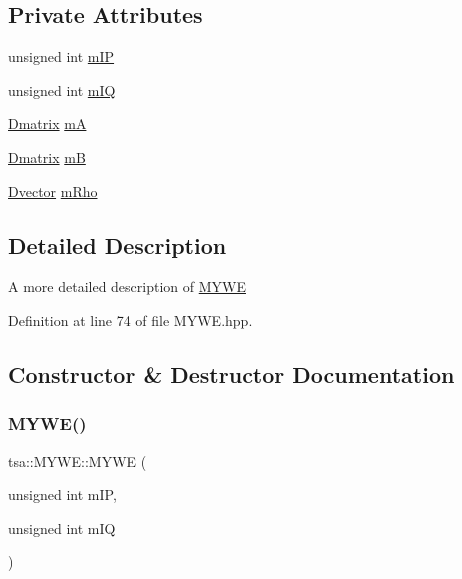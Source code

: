 \subsection*{Private Attributes}
\begin{DoxyCompactItemize}
\item 
unsigned int \hyperlink{classtsa_1_1_m_y_w_e_aefdc7e987eddb2a34daad521dd501840}{m\+IP}
\item 
unsigned int \hyperlink{classtsa_1_1_m_y_w_e_a7ad6499007931fab78ffa0300b0c21a5}{m\+IQ}
\item 
\hyperlink{namespacetsa_ad260cd21c1891c4ed391fe788569aba4}{Dmatrix} \hyperlink{classtsa_1_1_m_y_w_e_ad2fe73259b41c43616a5e950ae280547}{mA}
\item 
\hyperlink{namespacetsa_ad260cd21c1891c4ed391fe788569aba4}{Dmatrix} \hyperlink{classtsa_1_1_m_y_w_e_a8427296f338e43ee0457e8f2c11481ae}{mB}
\item 
\hyperlink{namespacetsa_a8900fb03d849baf447a1a0efe2561fb2}{Dvector} \hyperlink{classtsa_1_1_m_y_w_e_af8263479a7212e0ee89aedd7ae098ee0}{m\+Rho}
\end{DoxyCompactItemize}


\subsection{Detailed Description}
A more detailed description of \hyperlink{classtsa_1_1_m_y_w_e}{M\+Y\+WE} 

Definition at line 74 of file M\+Y\+W\+E.\+hpp.



\subsection{Constructor \& Destructor Documentation}
\mbox{\label{classtsa_1_1_m_y_w_e_a600550470fe4832dfd450a7aa60ad36b}} 
\subsubsection{\texorpdfstring{M\+Y\+W\+E()}{MYWE()}}
{\footnotesize\ttfamily tsa\+::\+M\+Y\+W\+E\+::\+M\+Y\+WE (\begin{DoxyParamCaption}\item[{unsigned int}]{m\+IP,  }\item[{unsigned int}]{m\+IQ }\end{DoxyParamCaption})}

